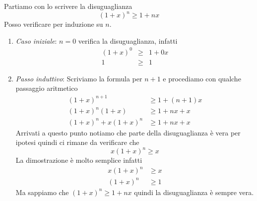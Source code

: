 \begin{example}
	Partiamo con lo scrivere la disuguaglianza
	\begin{equation*}
		(1 + x)^n \geq 1 + nx
	\end{equation*}
	Posso verificare per induzione su $n$.
	\begin{enumerate}
		\item \emph{Caso iniziale}: $n = 0$ verifica la disuguaglianza, infatti
		      \begin{equation*}
			      \begin{array}{rcl}
				      (1 + x)^0 & \geq & 1 + 0x \\
				      1         & \geq & 1
			      \end{array}
		      \end{equation*}
		\item \emph{Passo induttivo}: Scriviamo la formula per $n + 1$ e procediamo con qualche
		      passaggio aritmetico
		      \begin{equation*}
			      \begin{array}{ll}
				      (1 + x)^{n + 1}        & \geq 1 + (n + 1)x \\
				      (1 + x)^n (1 + x)      & \geq 1 + nx + x   \\
				      (1 + x)^n + x(1 + x)^n & \geq 1 + nx + x
			      \end{array}
		      \end{equation*}
		      Arrivati a questo punto notiamo che parte della disuguaglianza \`e vera per ipotesi
		      quindi ci rimane da verificare che
		      \begin{equation*}
			      x(1 + x)^n \geq x
		      \end{equation*}
		      La dimostrazione \`e molto semplice infatti
		      \begin{equation*}
			      \begin{array}{ll}
				      x(1 + x)^n & \geq x \\
				      (1 + x)^n  & \geq 1
			      \end{array}
		      \end{equation*}
		      Ma sappiamo che $(1 + x)^n \geq 1 + nx$ quindi la disuguaglianza \`e sempre vera.
	\end{enumerate}
\end{example}

